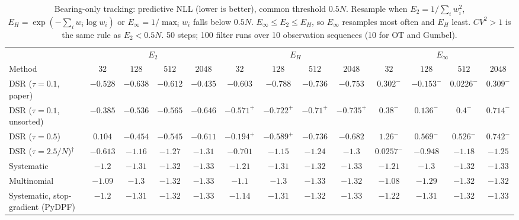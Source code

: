 \begin{table}[ht]
\centering
\small
\caption{Bearing-only tracking: predictive NLL (lower is better), common threshold $0.5N$. Resample when $E_2=1/\sum_iw_i^2$, $E_H=\exp(-\sum_iw_i\log w_i)$ or $E_\infty=1/\max_iw_i$ falls below $0.5N$. $E_\infty\le E_2\le E_H$, so $E_\infty$ resamples most often and $E_H$ least. $CV^2>1$ is the same rule as $E_2<0.5N$. 50 steps; 100 filter runs over 10 observation sequences (10 for OT and Gumbel).}
\label{tab:trigger-fixed-bearing-predictive_nll}
\begin{adjustbox}{max width=\linewidth}
\begin{tabular}{lcccc|cccc|cccc}
\toprule
 & \multicolumn{4}{c}{$E_2$} & \multicolumn{4}{c}{$E_H$} & \multicolumn{4}{c}{$E_\infty$} \\
\cmidrule(lr){2-5} \cmidrule(lr){6-9} \cmidrule(lr){10-13}
Method & $32$ & $128$ & $512$ & $2048$ & $32$ & $128$ & $512$ & $2048$ & $32$ & $128$ & $512$ & $2048$ \\
\midrule
DSR ($\tau{=}0.1$, paper) & $-0.528$ & $-0.638$ & $-0.612$ & $-0.435$ & $\mathbf{-0.603}$ & $\mathbf{-0.788}$ & $\mathbf{-0.736}$ & $\mathbf{-0.753}$ & $0.302^{-}$ & $-0.153^{-}$ & $0.0226^{-}$ & $0.309^{-}$ \\
DSR ($\tau{=}0.1$, unsorted) & $-0.385$ & $-0.536$ & $-0.565$ & $-0.646$ & $\mathbf{-0.571}^{+}$ & $\mathbf{-0.722}^{+}$ & $\mathbf{-0.71}^{+}$ & $\mathbf{-0.735}^{+}$ & $0.38^{-}$ & $0.136^{-}$ & $0.4^{-}$ & $0.714^{-}$ \\
DSR ($\tau{=}0.5$) & $0.104$ & $-0.454$ & $-0.545$ & $-0.611$ & $\mathbf{-0.194}^{+}$ & $\mathbf{-0.589}^{+}$ & $\mathbf{-0.736}$ & $\mathbf{-0.682}$ & $1.26^{-}$ & $0.569^{-}$ & $0.526^{-}$ & $0.742^{-}$ \\
DSR ($\tau{=}2.5/N$)$^\dagger$ & $-0.613$ & $\mathbf{-1.16}$ & $\mathbf{-1.27}$ & $\mathbf{-1.31}$ & $\mathbf{-0.701}$ & $-1.15$ & $-1.24$ & $-1.3$ & $0.0257^{-}$ & $-0.948$ & $-1.18$ & $-1.25$ \\
\midrule
Systematic & $-1.2$ & $-1.31$ & $-1.32$ & $-1.33$ & $-1.21$ & $\mathbf{-1.31}$ & $\mathbf{-1.32}$ & $\mathbf{-1.33}$ & $\mathbf{-1.21}$ & $-1.3$ & $-1.32$ & $-1.33$ \\
Multinomial & $-1.09$ & $-1.3$ & $-1.32$ & $\mathbf{-1.33}$ & $\mathbf{-1.1}$ & $\mathbf{-1.3}$ & $\mathbf{-1.33}$ & $-1.32$ & $-1.08$ & $-1.29$ & $-1.32$ & $-1.32$ \\
Systematic, stop-gradient (PyDPF) & $-1.2$ & $-1.31$ & $\mathbf{-1.32}$ & $\mathbf{-1.33}$ & $-1.14$ & $\mathbf{-1.31}$ & $-1.32$ & $-1.33$ & $\mathbf{-1.22}$ & $-1.31$ & $-1.32$ & $-1.33$ \\

\end{tabular}
\end{adjustbox}
\end{table}
